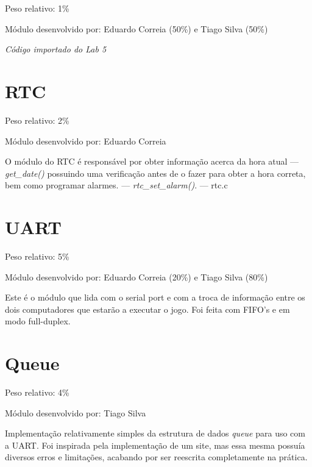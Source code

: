 \documentclass{report}
\begin{document}
Peso relativo: 1\%

Módulo desenvolvido por: Eduardo Correia (50\%) e Tiago Silva (50\%)
\newline

\textit{Código importado do Lab 5}\footnotemark[\value{footnote}]


\section{RTC}

Peso relativo: 2\%

Módulo desenvolvido por: Eduardo Correia
\newline

O módulo do RTC é responsável por obter informação acerca da hora atual --- \textit{get\_date()} possuindo uma verificação antes de o fazer para obter a hora correta, bem como programar alarmes. --- \textit{rtc\_set\_alarm()}. --- rtc.c \newline

\section{UART}

Peso relativo: 5\%

Módulo desenvolvido por: Eduardo Correia (20\%) e Tiago Silva (80\%)
\newline

Este é o módulo que lida com o serial port e com a troca de informação entre os dois computadores que estarão a executar o jogo. Foi feita com FIFO's e em modo full-duplex.
 
\section{Queue}

Peso relativo: 4\%

Módulo desenvolvido por: Tiago Silva
\newline

Implementação relativamente simples da estrutura de dados \textit{queue} para uso com a UART. Foi inspirada pela implementação de um site, mas essa mesma possuía diversos erros e limitações, acabando por ser reescrita completamente na prática.
\end{document}
